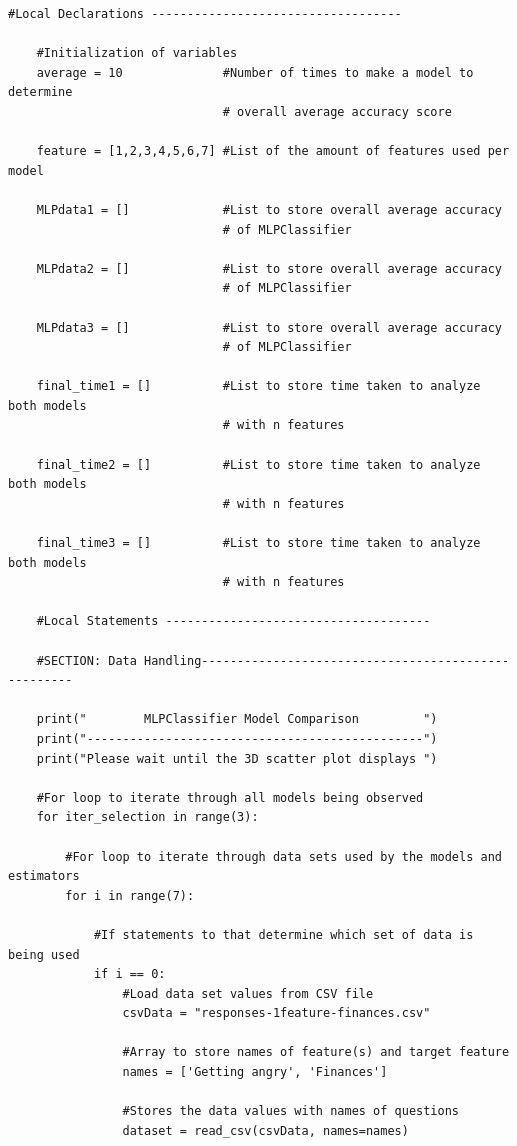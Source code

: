 \documentclass[a4paper, 12pt]{article}
\begin{document}
\begin{paragraph}
\begin{lstlisting}[frame = single]
    #Local Declarations -----------------------------------

    #Initialization of variables
    average = 10              #Number of times to make a model to determine
                              # overall average accuracy score

    feature = [1,2,3,4,5,6,7] #List of the amount of features used per model

    MLPdata1 = []             #List to store overall average accuracy
                              # of MLPClassifier

    MLPdata2 = []             #List to store overall average accuracy
                              # of MLPClassifier

    MLPdata3 = []             #List to store overall average accuracy
                              # of MLPClassifier

    final_time1 = []          #List to store time taken to analyze both models
                              # with n features

    final_time2 = []          #List to store time taken to analyze both models
                              # with n features

    final_time3 = []          #List to store time taken to analyze both models
                              # with n features
    
    #Local Statements -------------------------------------

    #SECTION: Data Handling----------------------------------------------------

    print("        MLPClassifier Model Comparison         ")
    print("-----------------------------------------------")
    print("Please wait until the 3D scatter plot displays ")

    #For loop to iterate through all models being observed
    for iter_selection in range(3):
  
        #For loop to iterate through data sets used by the models and estimators
        for i in range(7):

            #If statements to that determine which set of data is being used
            if i == 0:
                #Load data set values from CSV file
                csvData = "responses-1feature-finances.csv"
                
                #Array to store names of feature(s) and target feature
                names = ['Getting angry', 'Finances']

                #Stores the data values with names of questions
                dataset = read_csv(csvData, names=names)


\end{lstlisting}
\end{paragraph}
\end{document}
